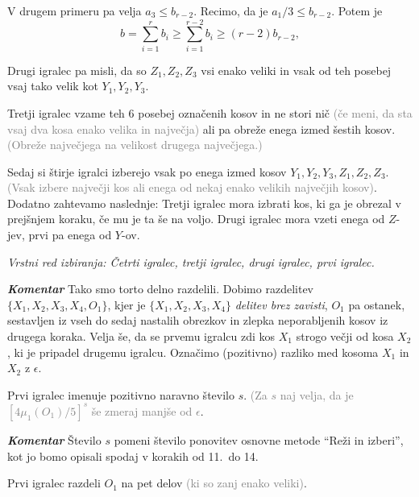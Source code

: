\documentclass[a4paper,12pt]{article}
\begin{document}
\begin{protokol}
V drugem primeru pa velja $a_3 \leq b_{r-2}$. Recimo, da je $a_1/3 \leq b_{r-2}$. Potem je $$b = \sum_{i=1}^r b_i \geq  \sum_{i=1}^{r-2} b_i \geq (r-2) b_{r-2},$$


 Drugi igralec pa misli, da so $Z_1, Z_2, Z_3$ vsi enako veliki in vsak od teh posebej vsaj tako velik kot $Y_1, Y_2, Y_3$.

\item Tretji igralec vzame teh 6 posebej označenih kosov in ne stori nič \textcolor{gray}{(če meni, da sta vsaj dva kosa enako velika in največja)} ali pa obreže enega izmed šestih kosov. \textcolor{gray}{(Obreže največjega na velikost drugega največjega.)}

\item  Sedaj si štirje igralci izberejo vsak po enega izmed kosov $Y_1, Y_2, Y_3, Z_1, Z_2, Z_3$. \textcolor{gray}{(Vsak izbere največji kos ali enega od nekaj enako velikih največjih kosov)}. Dodatno zahtevamo naslednje: Tretji igralec mora izbrati kos, ki ga je obrezal v prejšnjem koraku, če mu je ta še na voljo. Drugi igralec mora vzeti enega od $Z$-jev, prvi pa enega od $Y$-ov.

\textsl{Vrstni red izbiranja: Četrti igralec, tretji igralec, drugi igralec, prvi igralec.}

\item [\textbf{\em Komentar}] Tako smo torto delno razdelili. Dobimo razdelitev ${\{X_1, X_2, X_3, X_4, O_1\}}$, kjer je ${\{X_1, X_2, X_3, X_4\}}$ {\em delitev brez zavisti}, $O_1$ pa ostanek, sestavljen iz vseh do sedaj nastalih obrezkov in zlepka neporabljenih kosov iz drugega koraka. Velja še, da se prvemu igralcu zdi kos $X_1$ strogo večji od kosa $X_2$, ki je pripadel drugemu igralcu. Označimo (pozitivno) razliko med kosoma $X_1$ in $X_2$ z $\epsilon$.

\item Prvi igralec imenuje pozitivno naravno število $s$. \textcolor{gray}{(Za $s$ naj velja, da je $[4\mu_1(O_1)/5]^s$ še zmeraj manjše od $\epsilon$}. 

\item [\textbf{\em Komentar}] Število $s$ pomeni število ponovitev osnovne metode ``Reži in izberi'', kot jo bomo opisali spodaj v korakih od 11.~do 14.


\item Prvi igralec razdeli $O_1$ na pet delov \textcolor{gray}{(ki so zanj enako veliki)}.


\end{protokol}
\end{document}
